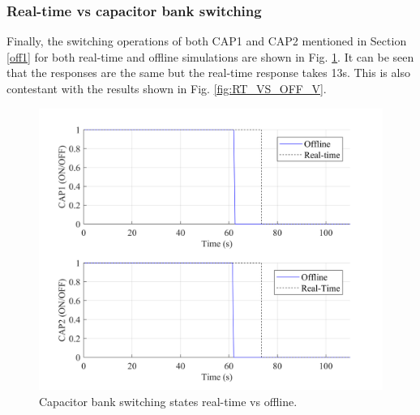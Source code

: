 \subsubsection{Real-time vs capacitor bank switching}
Finally, the switching operations of both CAP1 and CAP2 mentioned in Section \ref{off1} for both real-time and offline simulations are shown in Fig. \ref{fig:RT_CAP}. It can be seen that the responses are the same but the real-time response takes 13s. This is also contestant with the results shown in Fig. \ref{fig:RT_VS_OFF_V}.

\begin{figure}[!h]
\centering
\includegraphics[width=\linewidth]{figs/CAPS_RT.PNG}
\caption{Capacitor bank switching states real-time vs offline.}
\label{fig:RT_CAP}
\end{figure}
